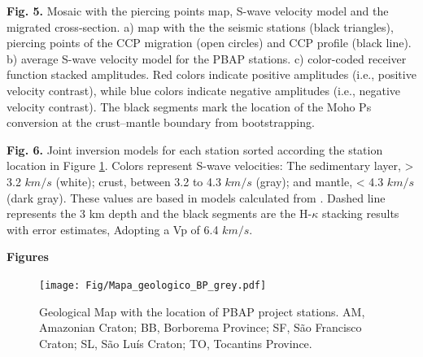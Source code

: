 \documentclass[paper,11pt]{geophysics}
\begin{document}
\textbf{Fig. 5.} Mosaic with the piercing points map, S-wave velocity model and the migrated cross-section. a) map with the the seismic stations (black triangles), piercing points of the CCP migration (open circles) and CCP profile (black line). b) average S-wave velocity model for the PBAP stations. c) color-coded receiver function stacked amplitudes. Red colors indicate positive amplitudes (i.e., positive velocity contrast), while blue colors indicate negative amplitudes (i.e., negative velocity contrast). The black segments mark the location of the Moho Ps conversion at the crust–mantle boundary from bootstrapping.

\textbf{Fig. 6.} Joint inversion models for each station sorted according the station location in Figure \ref{mapa_estacoes_geologico}. Colors represent S-wave velocities: The sedimentary layer, > 3.2 $km/s$ (white); crust, between 3.2 to 4.3 $km/s$ (gray); and mantle, < 4.3 $km/s$ (dark gray). These values are based in models calculated from \cite{mooney_crust_1998}. Dashed line represents the 3 km depth and the black segments are the H-$\kappa$ stacking results with error estimates, Adopting a Vp of 6.4 $km/s$.

    
\pagebreak

\begin{flushleft}
\textbf{\LARGE Figures}
\end{flushleft}


\begin{figure}[!ht]
\begin{center}
\texttt{[image: Fig/Mapa\_geologico\_BP\_grey.pdf]}
\caption{Geological Map with the location of PBAP project stations. AM, Amazonian Craton; BB, Borborema Province; SF, São Francisco Craton; SL, São Luís Craton; TO, Tocantins Province.}
\label{mapa_estacoes_geologico}
\end{center}
\end{figure}

\pagebreak
\end{document}
